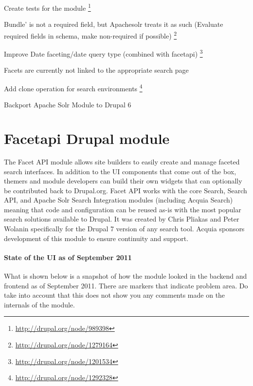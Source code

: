 \begin{packed_itemize}
\item Create tests for the module \footnote{\url{http://drupal.org/node/989398}}
\item Bundle' is not a required field, but Apachesolr treats it as such (Evaluate required fields in schema, make non-required if possible) \footnote{\url{http://drupal.org/node/1279164}}
\item Improve Date faceting/date query type (combined with facetapi) \footnote{\url{http://drupal.org/node/1201534}}
\item Facets are currently not linked to the appropriate search page
\item Add clone operation for search environments \footnote{\url{http://drupal.org/node/1292328}}
\item Backport Apache Solr Module to Drupal 6
\end{packed_itemize}

\section{Facetapi Drupal module}
The Facet API module allows site builders to easily create and manage faceted search interfaces. In addition to the UI components that come out of the box, themers and module developers can build their own widgets that can optionally be contributed back to Drupal.org. Facet API works with the core Search, Search API, and Apache Solr Search Integration modules (including Acquia Search) meaning that code and configuration can be reused as-is with the most popular search solutions available to Drupal. It was created by Chris Pliakas and Peter Wolanin specifically for the Drupal 7 version of any search tool. Acquia sponsors development of this module to ensure continuity and support.

\paragraph{State of the UI as of September 2011} What is shown below is a snapshot of how the module looked in the backend and frontend as of September 2011. There are markers that indicate problem area. Do take into account that this does not show you any comments made on the internals of the module.

